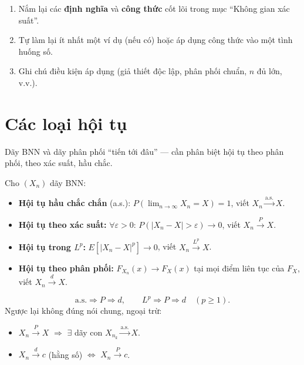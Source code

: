 \documentclass[12pt,a4paper]{article}
\begin{document}
\begin{tongket}[title={Tổng kết: Không gian xác suất}]
\begin{enumerate}
  \item Nắm lại các \textbf{định nghĩa} và \textbf{công thức} cốt lõi trong mục ``Không gian xác suất''.
  \item Tự làm lại ít nhất một ví dụ (nếu có) hoặc áp dụng công thức vào một tình huống số.
  \item Ghi chú điều kiện áp dụng (giả thiết độc lập, phân phối chuẩn, $n$ đủ lớn, v.v.).
\end{enumerate}
\end{tongket}

\section{Các loại hội tụ}

\begin{dongco}[title={Động cơ --- Các loại hội tụ}]
Dãy BNN và dãy phân phối ``tiến tới đâu'' --- cần phân biệt hội tụ theo phân phối, theo xác suất, hầu chắc.
\end{dongco}

\begin{dinhnghia}
  Cho $(X_n)$ dãy BNN:
  \begin{itemize}
    \item \textbf{Hội tụ hầu chắc chắn} (a.s.): $P\!\left(\lim_{n \to \infty} X_n = X\right) = 1$, viết $X_n \xrightarrow{\text{a.s.}} X$.
    \item \textbf{Hội tụ theo xác suất:} $\forall \varepsilon > 0$: $P(|X_n - X| > \varepsilon) \to 0$, viết $X_n \xrightarrow{P} X$.
    \item \textbf{Hội tụ trong $L^p$:} $E[|X_n - X|^p] \to 0$, viết $X_n \xrightarrow{L^p} X$.
    \item \textbf{Hội tụ theo phân phối:} $F_{X_n}(x) \to F_X(x)$ tại mọi điểm liên tục của $F_X$, viết $X_n \xrightarrow{d} X$.
  \end{itemize}
\end{dinhnghia}

\begin{dinhly}[title={Quan hệ giữa các loại hội tụ}]
  \[
    \text{a.s.} \Rightarrow P \Rightarrow d, \qquad L^p \Rightarrow P \Rightarrow d \quad(p \ge 1).
  \]
  Ngược lại không đúng nói chung, ngoại trừ:
  \begin{itemize}
    \item $X_n \xrightarrow{P} X$ $\Rightarrow$ $\exists$ dãy con $X_{n_k} \xrightarrow{\text{a.s.}} X$.
    \item $X_n \xrightarrow{d} c$ (hằng số) $\Leftrightarrow$ $X_n \xrightarrow{P} c$.
  \end{itemize}
\end{dinhly}
\end{document}
